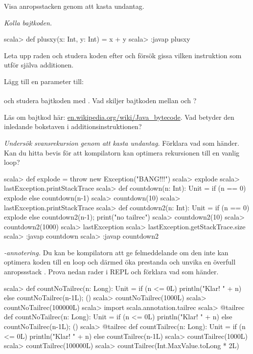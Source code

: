\ExtraTasks %

\Task Visa anropsstacken genom att kasta undantag.

\AdvancedTasks %



\Task \emph{Kolla bajtkoden.}
\begin{REPL}
scala> def plusxy(x: Int, y: Int) = x + y
scala> :javap plusxy
\end{REPL}

\Subtask Leta upp raden  och studera koden efter  och försök gissa vilken instruktion som utför själva additionen.

\Subtask Lägg till en parameter till: \\ 
\\ och studera bajtkoden med . Vad skiljer bajtkoden mellan  och ?

\Subtask\Pen Läs om bajtkod här: \href{https://en.wikipedia.org/wiki/Java\_bytecode}{en.wikipedia.org/wiki/Java\_bytecode}. Vad betyder den inledande bokstaven i additionsinstruktionen?


\Task \emph{Undersök svansrekursion genom att kasta undantag.} Förklara vad som händer. Kan du hitta bevis för att kompilatorn kan optimera rekursionen till en vanlig loop?

\begin{REPL}
scala> def explode = throw new Exception("BANG!!!")
scala> explode
scala> lastException.printStackTrace
scala> def countdown(n: Int): Unit = 
         if (n == 0) explode else countdown(n-1)
scala> countdown(10)
scala> lastException.printStackTrace
scala> def countdown2(n: Int): Unit = 
         if (n == 0) explode else {countdown2(n-1); print("no tailrec")}
scala> countdown2(10)
scala> countdown2(1000)
scala> lastException
scala> lastException.getStackTrace.size
scala> :javap countdown
scala> :javap countdown2
\end{REPL}

\Task \emph{-annotering.} Du kan be kompilatorn att ge felmeddelande om den inte kan optimera koden till en loop och därmed öka prestanda och unvika en överfull anropssstack . Prova nedan rader i REPL och förklara vad som händer. 
\begin{REPL}
scala> def countNoTailrec(n: Long): Unit = 
         if (n <= 0L) println("Klar! " + n) else {countNoTailrec(n-1L); ()}
scala> countNoTailrec(1000L)
scala> countNoTailrec(100000L) 
scala> import scala.annotation.tailrec
scala> @tailrec def countNoTailrec(n: Long): Unit = 
         if (n <= 0L) println("Klar! " + n) else {countNoTailrec(n-1L); ()}        
scala> @tailrec def countTailrec(n: Long): Unit = 
         if (n <= 0L) println("Klar! " + n) else countTailrec(n-1L)
scala> countTailrec(1000L)
scala> countTailrec(100000L)
scala> countTailrec(Int.MaxValue.toLong * 2L)
\end{REPL}


